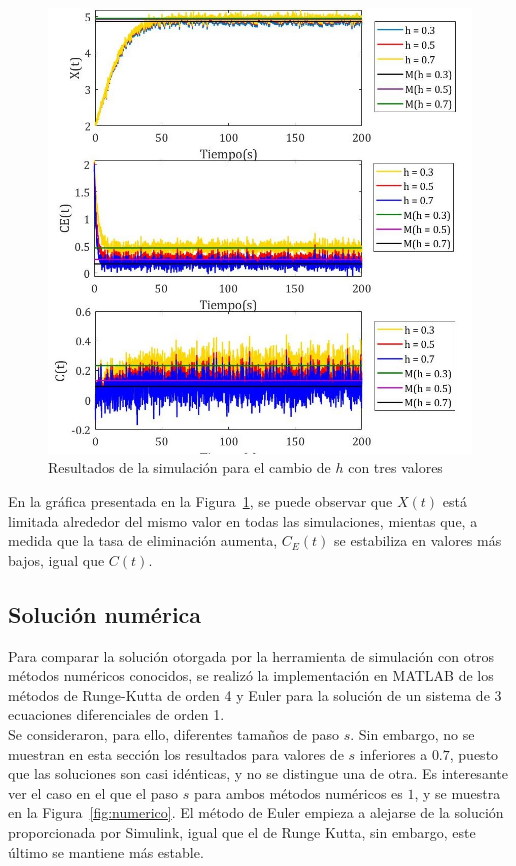 \begin{figure}[ht!]
\centering
\includegraphics[scale = 0.37]{cambio2}
\caption{Resultados de la simulación para el cambio de $h$ con tres valores}
\label{fig:cambio-par2}
\end{figure}

En la gráfica presentada en la Figura~\ref{fig:cambio-par2}, se puede observar que $X(t)$ está limitada alrededor del mismo valor en todas las simulaciones, mientas que, a medida que la tasa de eliminación aumenta, $C_E(t)$ se estabiliza en valores más bajos, igual que $C(t)$.


\subsection{Solución numérica}
\label{sec:numericos}
Para comparar la solución otorgada por la herramienta de simulación con otros métodos numéricos conocidos, se realizó la implementación en MATLAB de los métodos de Runge-Kutta de orden 4 y Euler para la solución de un sistema de 3 ecuaciones diferenciales de orden 1. \\
Se consideraron, para ello, diferentes tamaños de paso $s$. Sin embargo, no se muestran en esta sección los resultados para valores de $s$ inferiores a $0.7$, puesto que las soluciones son casi idénticas, y no se distingue una de otra. Es interesante ver el caso en el que el paso $s$ para ambos métodos numéricos es $1$, y se muestra en la Figura~\ref{fig:numerico}. El método de Euler empieza a alejarse de la solución proporcionada por Simulink, igual que el de Runge Kutta, sin embargo, este último se mantiene más estable.

